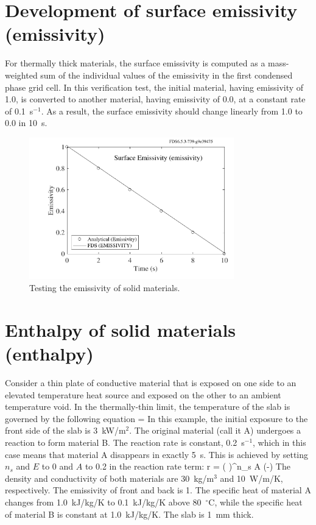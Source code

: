 \documentclass[11pt]{book}
\begin{document}
\clearpage

\section{Development of surface emissivity (\texorpdfstring{{\bf emissivity}}{emissivity})}

For thermally thick materials, the surface emissivity is computed as a
mass-weighted sum of the individual values of the emissivity
in the first condensed phase grid cell. In this verification test, the
initial material, having emissivity of 1.0, is converted to another
material, having emissivity of 0.0, at a constant rate of 0.1~s$^{-1}$. As a
result, the surface emissivity should change linearly from 1.0 to 0.0 in 10~s.

\begin{figure}[ht]
\begin{center}
\includegraphics[width=3.5in]{SCRIPT_FIGURES/emissivity}
\end{center}
\caption[The {\bf emissivity} test case.]{Testing the emissivity of solid materials.}
\label{emissivity}
\end{figure}


\clearpage

\section{Enthalpy of solid materials (\texorpdfstring{{\bf enthalpy}}{enthalpy})}

Consider a thin plate of conductive material that is exposed on one side to an elevated temperature heat source and exposed on the
other to an ambient temperature void. In the thermally-thin limit, the temperature of the slab is governed by the following equation
\be
    = 
\ee
In this example, the initial exposure to the front side of the slab is
3~kW/m$^2$. The original material (call it A) undergoes a reaction to form material B.  The reaction rate is constant, 0.2~s$^{-1}$, which in this
case means that material A disappears in exactly 5~s. This is achieved by setting $n_s$ and $E$ to 0 and $A$ to 0.2 in the reaction rate term:
\be
    r = \left( \right)^{n_{s}}
    A \; \exp \left(-\right)
\ee
The density and conductivity of both materials are
30~kg/m$^3$ and 10~W/m/K, respectively. The emissivity of front and back is 1.  The specific heat of material A changes from
1.0~kJ/kg/K to 0.1~kJ/kg/K above 80~$^\circ$C, while the specific heat of material B is constant at 1.0~kJ/kg/K. The slab is 1~mm thick.
\end{document}
